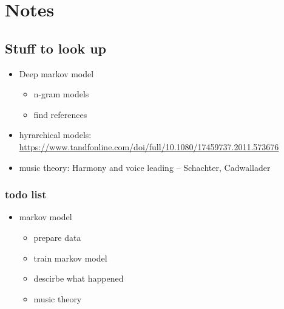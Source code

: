 \documentclass[10pt,a4paper]{scrarticle}
\theoremstyle{plain}
\theoremstyle{definition}
\theoremstyle{remark}
\begin{document}
    \section{Notes}
    \subsection{Stuff to look up}
    \begin{itemize}
      \item Deep markov model
        \begin{itemize}
          \item n-gram models
          \item find references
        \end{itemize}
      \item hyrarchical models:\\ \url{https://www.tandfonline.com/doi/full/10.1080/17459737.2011.573676}
      \item music theory: Harmony and voice leading -- Schachter, Cadwallader
    \end{itemize}

    \subsubsection{todo list}
    \begin{itemize}
      \item markov model
        \begin{itemize}
          \item prepare data
          \item train markov model
          \item descirbe what happened
          \item music theory
        \end{itemize}
    \end{itemize}
\end{document}
